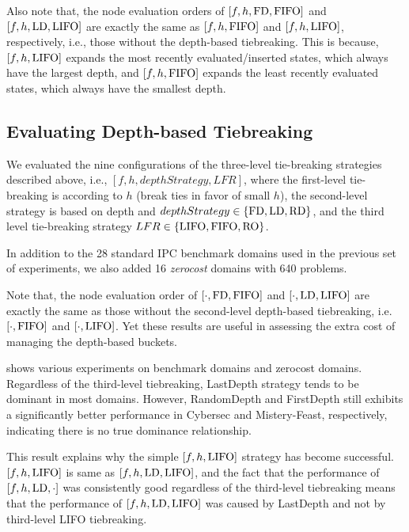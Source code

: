 Also note that, the node evaluation orders of $[f,h,\mbox{FD},\mbox{FIFO}]$ and $[f,h,\mbox{LD},\mbox{LIFO}]$ are
exactly the same as $[f,h,\mbox{FIFO}]$ and $[f,h,\mbox{LIFO}]$, respectively,
i.e., those without the depth-based tiebreaking.  
This is because, $[f,h,\mbox{LIFO}]$ expands the most recently evaluated/inserted
states, which always have the largest depth, and $[f,h,\mbox{FIFO}]$ expands the least recently
evaluated states, which always have the smallest depth.

 


\subsection{Evaluating Depth-based Tiebreaking}

We evaluated the nine configurations of the three-level tie-breaking strategies described above, i.e., $[f,h,depthStrategy,LFR]$, where the first-level tie-breaking is according to $h$ (break ties in favor of small $h$), the second-level strategy is based on depth and $depthStrategy \in \{\mbox{FD}, \mbox{LD}, \mbox{RD}\}$, and the third level tie-breaking strategy $LFR \in \{\mbox{LIFO}, \mbox{FIFO}, \mbox{RO}\}$.

In addition to the 28 standard IPC benchmark domains used in the previous set of experiments, we also added 16 \emph{zerocost} domains with 640 problems. 

Note that, the node evaluation order of $[\cdot,\mbox{FD},\mbox{FIFO}]$ and $[\cdot,\mbox{LD},\mbox{LIFO}]$
are exactly the same as those without the second-level
depth-based tiebreaking, i.e.\ $[\cdot,\mbox{FIFO}]$ and $[\cdot,\mbox{LIFO}]$.
Yet these results are useful in assessing the extra cost of managing the
depth-based buckets.

 shows various experiments on benchmark domains and
zerocost domains. Regardless of the third-level tiebreaking, LastDepth
strategy tends to be dominant in most domains. However, RandomDepth and
FirstDepth still exhibits a significantly better performance in Cybersec
and Mistery-Feast, respectively, indicating there is no true dominance relationship.

This result explains why the simple $[f,h,\mbox{LIFO}]$ strategy has become
successful. $[f,h,\mbox{LIFO}]$ is same as $[f,h,\mbox{LD},\mbox{LIFO}]$, and the fact
that the performance of $[f,h,\mbox{LD},\cdot]$ was consistently good
regardless of the third-level tiebreaking means that the performance of
$[f,h,\mbox{LD},\mbox{LIFO}]$ was caused by LastDepth and not by third-level LIFO tiebreaking.

